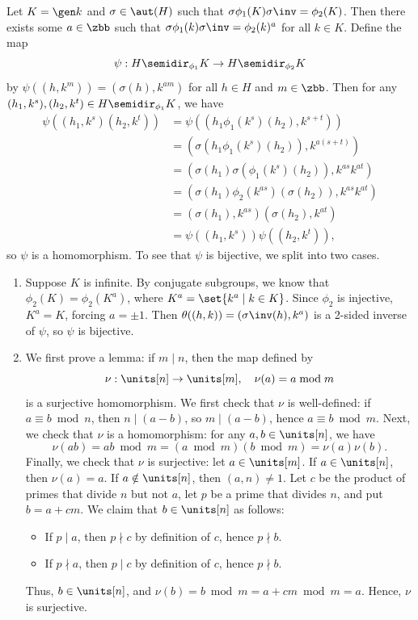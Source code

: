\begin{sol}[spsol]
    Let $K = \gen k$ and $\sigma \in \aut(H)$ such that $\sigma\phi_1(K)\sigma\inv = \phi_2(K)$.
	Then there exists some $a \in \zbb$ such that $\sigma\phi_1(k)\sigma\inv = \phi_2(k)^a$ for all $k \in K$.
	Define the map
    \[
    	\psi : H \semidir_{\phi_1} K \to H \semidir_{\phi_2} K
    \]
    by $\psi((h, k^m)) = (\sigma(h), k^{am})$ for all $h \in H$ and $m \in \zbb$.
	Then for any $(h_1, k^s), (h_2, k^t) \in H \semidir_{\phi_1} K$, we have
    \begin{align*}
        \psi((h_1, k^s)(h_2, k^t)) & = \psi((h_1\phi_1(k^s)(h_2), k^{s + t})) \\
        & = (\sigma(h_1\phi_1(k^s)(h_2)), k^{a(s + t)}) \\
        & = (\sigma(h_1)\sigma(\phi_1(k^s)(h_2)), k^{as}k^{at}) \\
        & = (\sigma(h_1)\phi_2(k^{as})(\sigma(h_2)), k^{as}k^{at}) \\
        & = (\sigma(h_1), k^{as})(\sigma(h_2), k^{at}) \\
        & = \psi((h_1, k^s))\psi((h_2, k^t)),
    \end{align*}
    so $\psi$ is a homomorphism.
	To see that $\psi$ is bijective, we split into two cases.
    \begin{enumerate}
        \item Suppose $K$ is infinite.
	By conjugate subgroups, we know that $\phi_2(K) = \phi_2(K^a)$, where $K^a = \set{k^a \mid k \in K}$.
	Since $\phi_2$ is injective, $K^a = K$, forcing $a = \pm 1$.
	Then $\theta((h, k)) = (\sigma\inv(h), k^a)$ is a 2-sided inverse of $\psi$, so $\psi$ is bijective.
        \item We first prove a lemma: if $m \mid n$, then the map defined by
        \[
        	\nu : \units[n] \to \units[m], \quad \nu(a) = a \bmod m
        \]
        is a surjective homomorphism.
	We first check that $\nu$ is well-defined: if $a \equiv b \bmod n$, then $n \mid (a - b)$, so $m \mid (a - b)$, hence $a \equiv b \bmod m$.
	Next, we check that $\nu$ is a homomorphism: for any $a, b \in \units[n]$, we have
        \[
        	\nu(ab) = ab \bmod m = (a \bmod m)(b \bmod m) = \nu(a)\nu(b).
        \]
        Finally, we check that $\nu$ is surjective: let $a \in \units[m]$.
	If $a \in \units[n]$, then $\nu(a) = a$.
	If $a \notin \units[n]$, then $(a, n) \neq 1$.
	Let $c$ be the product of primes that divide $n$ but not $a$, let $p$ be a prime that divides $n$, and put $b = a + cm$.
	We claim that $b \in \units[n]$ as follows:
        \begin{itemize}
            \item If $p \mid a$, then $p \nmid c$ by definition of $c$, hence $p \nmid b$.
            \item If $p \nmid a$, then $p \mid c$ by definition of $c$, hence $p \nmid b$.
        \end{itemize}
        Thus, $b \in \units[n]$, and $\nu(b) = b \bmod m = a + cm \bmod m = a$.
	Hence, $\nu$ is surjective.
        

\end{enumerate}
\end{sol}
